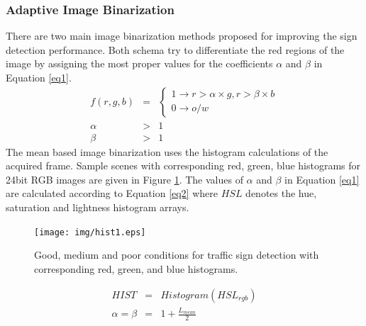 \documentclass[a4paper,oneside,12pt]{report}
\begin{document}
\subsubsection{Adaptive Image Binarization}
There are two main image binarization methods proposed for improving the sign detection performance. Both schema try to differentiate the red regions of the image by assigning the most proper values for the coefficients $\alpha$ and $\beta$ in Equation \ref{eq1}.
\begin{eqnarray}
\label{eq1}
f(r,g,b)&=& \left\{\begin{array}{l} 1 \rightarrow r>\alpha \times g, r>\beta \times b \\ 
																		0 \rightarrow o/w \end{array}\right.\\
\nonumber \alpha &>& 1 \\
\nonumber \beta &>& 1
\end{eqnarray}
The mean based image binarization uses the histogram calculations of the acquired frame. Sample scenes with corresponding red, green, blue histograms for 24bit RGB images are given in Figure \ref{fig:hist1}. The values of $\alpha$ and $\beta$ in Equation \ref{eq1} are calculated according to Equation \ref{eq2} where $HSL$ denotes the hue, saturation and lightness histogram arrays.
\begin{figure}[ht]
\begin{center}
\texttt{[image: img/hist1.eps]}
\caption{Good, medium and poor conditions for traffic sign detection with corresponding red, green, and blue histograms.}
\label{fig:hist1}
\end{center}
\end{figure}
\begin{figure}

\begin{eqnarray}
\label{eq2}
HIST &=& Histogram(HSL_{rgb}) \\
\nonumber \alpha = \beta &=& 1 + \frac {L_{mean}}{2}
\end{eqnarray}
\end{figure}
\end{document}
